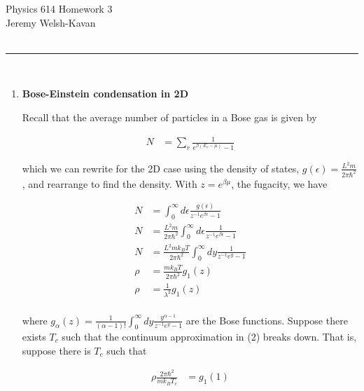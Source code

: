 \documentclass[]{article}
\begin{document}
{\Large Physics 614 Homework 3}\\
{Jeremy Welsh-Kavan}\\
\vspace{0.2 cm}
\hfill \\
\noindent\rule{15cm}{0.4pt} \\

\begin{enumerate}[1.]

\item {\bf  Bose-Einstein condensation in 2D}

Recall that the average number of particles in a Bose gas is given by

\begin{equation}
\begin{split}
N & = \sum_r \frac{1}{ e^{\beta(E_r-\mu)} - 1   }
\end{split}
\end{equation}

which we can rewrite for the 2D case using the density of states, $g(\epsilon) = \frac{L^2m}{2\pi \hbar^2}$, and rearrange to find the density. With $z = e^{\beta\mu}$, the fugacity, we have

\begin{equation}
\begin{split}
N & =  \int_{0}^{\infty} d\epsilon \frac{ g(\epsilon) }{ z^{-1} e^{\beta\epsilon} -1  } \\
N & =  \frac{L^2m}{2\pi \hbar^2}\int_{0}^{\infty} d\epsilon \frac{ 1}{ z^{-1} e^{\beta\epsilon} -1  } \\
N & =  \frac{L^2mk_BT}{2\pi \hbar^2}\int_{0}^{\infty} dy \frac{ 1}{ z^{-1} e^{y} -1  } \\
\rho & =  \frac{mk_BT}{2\pi \hbar^2} g_1(z)   \\
\rho & =  \frac{1}{ \lambda^2} g_1(z)   \\
\end{split}
\end{equation}

where $g_\alpha(z) = \frac{1}{(\alpha-1)!} \int_{0}^{\infty} dy\frac{y^{\alpha-1}}{ z^{-1}e^y -1}$ are the Bose functions. Suppose there exists $T_c$ such that the continuum approximation in (2) breaks down. That is, suppose there is $T_c$ such that

\begin{equation}
\begin{split}
\rho \frac{2\pi \hbar^2}{mk_BT_c} & =  g_1(1)   \\
\end{split}
\end{equation}


\end{enumerate}
\end{document}
